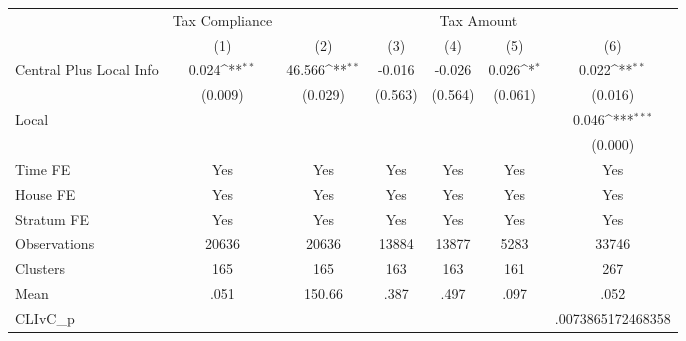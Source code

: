 {
\def\sym#1{\ifmmode^{#1}\else\(^{#1}\)\fi}
\begin{tabular}{l*{6}{c}}
\hline\hline
                &\multicolumn{1}{c}{Tax Compliance}&\multicolumn{5}{c}{Tax Amount}                                                                \\
                &\multicolumn{1}{c}{(1)}         &\multicolumn{1}{c}{(2)}         &\multicolumn{1}{c}{(3)}         &\multicolumn{1}{c}{(4)}         &\multicolumn{1}{c}{(5)}         &\multicolumn{1}{c}{(6)}         \\
\hline
Central Plus Local Info&    0.024\sym{**} &   46.566\sym{**} &   -0.016         &   -0.026         &    0.026\sym{*}  &    0.022\sym{**} \\
                &  (0.009)         &  (0.029)         &  (0.563)         &  (0.564)         &  (0.061)         &  (0.016)         \\
Local           &                  &                  &                  &                  &                  &    0.046\sym{***}\\
                &                  &                  &                  &                  &                  &  (0.000)         \\
Time FE         &      Yes         &      Yes         &      Yes         &      Yes         &      Yes         &      Yes         \\
House FE        &      Yes         &      Yes         &      Yes         &      Yes         &      Yes         &      Yes         \\
Stratum FE      &      Yes         &      Yes         &      Yes         &      Yes         &      Yes         &      Yes         \\
\hline
Observations    &    20636         &    20636         &    13884         &    13877         &     5283         &    33746         \\
Clusters        &      165         &      165         &      163         &      163         &      161         &      267         \\
Mean            &     .051         &   150.66         &     .387         &     .497         &     .097         &     .052         \\
CLIvC\_p         &                  &                  &                  &                  &                  &.0073865172468358         \\
\hline\hline
\end{tabular}
}
